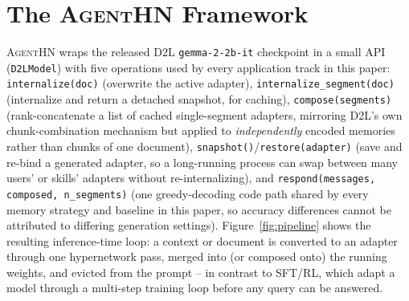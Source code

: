\documentclass[11pt]{article}
\newcommand{\DTL}{D2L}
\newcommand{\agenthn}{\textsc{AgentHN}}
\newcommand{\mt}[1]{\texttt{\small #1}}
\begin{document}
\section{The \agenthn{} Framework}
\label{sec:framework}

\agenthn{} wraps the released \DTL{} \mt{gemma-2-2b-it} checkpoint in a small API (\mt{D2LModel}) with five operations used by every application track in this paper: \mt{internalize(doc)} (overwrite the active adapter), \mt{internalize\_segment(doc)} (internalize and return a detached snapshot, for caching), \mt{compose(segments)} (rank-concatenate a list of cached single-segment adapters, mirroring \DTL{}'s own chunk-combination mechanism but applied to \emph{independently} encoded memories rather than chunks of one document), \mt{snapshot()}/\mt{restore(adapter)} (save and re-bind a generated adapter, so a long-running process can swap between many users' or skills' adapters without re-internalizing), and \mt{respond(messages, composed, n\_segments)} (one greedy-decoding code path shared by every memory strategy and baseline in this paper, so accuracy differences cannot be attributed to differing generation settings). Figure~\ref{fig:pipeline} shows the resulting inference-time loop: a context or document is converted to an adapter through one hypernetwork pass, merged into (or composed onto) the running weights, and evicted from the prompt -- in contrast to SFT/RL, which adapt a model through a multi-step training loop before any query can be answered.
\end{document}
